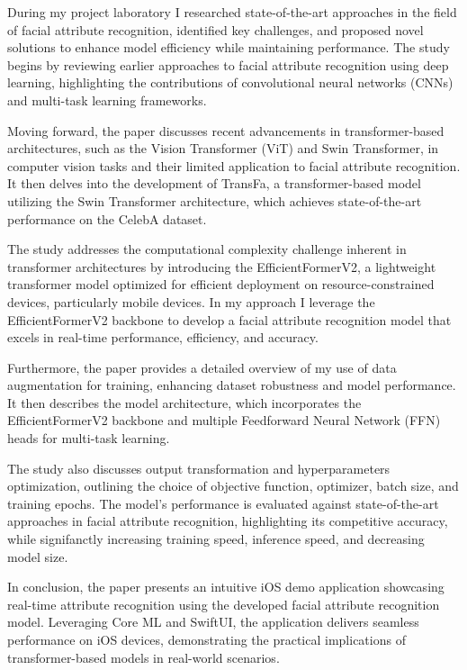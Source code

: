 \documentclass[a4paper,oneside]{article}
\begin{document}
During my project laboratory I researched state-of-the-art approaches in the field of facial attribute recognition, identified key challenges, and proposed novel solutions to enhance model efficiency while maintaining performance.
The study begins by reviewing earlier approaches to facial attribute recognition using deep learning, highlighting the contributions of convolutional neural networks (CNNs) and multi-task learning frameworks.

Moving forward, the paper discusses recent advancements in transformer-based architectures, such as the Vision Transformer (ViT) and Swin Transformer, in computer vision tasks and their limited application to facial attribute recognition.
It then delves into the development of TransFa, a transformer-based model utilizing the Swin Transformer architecture, which achieves state-of-the-art performance on the CelebA dataset.

The study addresses the computational complexity challenge inherent in transformer architectures by introducing the EfficientFormerV2, a lightweight transformer model optimized for efficient deployment on resource-constrained devices, particularly mobile devices.
In my approach I leverage the EfficientFormerV2 backbone to develop a facial attribute recognition model that excels in real-time performance, efficiency, and accuracy.

Furthermore, the paper provides a detailed overview of my use of data augmentation for training, enhancing dataset robustness and model performance.
It then describes the model architecture, which incorporates the EfficientFormerV2 backbone and multiple Feedforward Neural Network (FFN) heads for multi-task learning.

The study also discusses output transformation and hyperparameters optimization, outlining the choice of objective function, optimizer, batch size, and training epochs.
The model's performance is evaluated against state-of-the-art approaches in facial attribute recognition, highlighting its competitive accuracy, while signifanctly increasing training speed, inference speed, and decreasing model size.

In conclusion, the paper presents an intuitive iOS demo application showcasing real-time attribute recognition using the developed facial attribute recognition model.
Leveraging Core ML and SwiftUI, the application delivers seamless performance on iOS devices, demonstrating the practical implications of transformer-based models in real-world scenarios.

\newpage
\label{sec:references}




\end{document}
